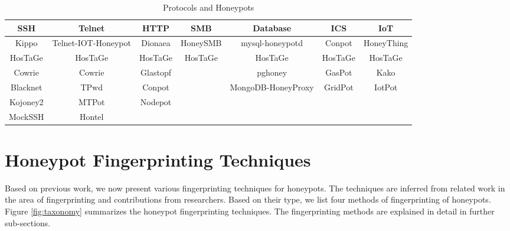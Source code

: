 \documentclass[letterpaper, 10 pt, conference]{ieeeconf}  %
\begin{document}
\begin{table}[ht!]
\caption{\label{tab:Table1}Protocols and Honeypots}
\centering
 \begin{tabular}{||c c c c c c c||} 
 \hline
 SSH & Telnet & HTTP & SMB & Database & ICS & IoT\\ [0.5ex] 
 \hline
 Kippo & Telnet-IOT-Honeypot & Dionaea & HoneySMB & mysql-honeypotd & Conpot & HoneyThing\\ 
 
 HosTaGe &  HosTaGe &  HosTaGe &  HosTaGe &  HosTaGe &  HosTaGe &  HosTaGe  \\
 
 Cowrie & Cowrie & Glastopf &  & pghoney & GasPot & Kako\\

 Blacknet & TPwd & Conpot &  & MongoDB-HoneyProxy & GridPot & IotPot\\
 
 Kojoney2 & MTPot & Nodepot & & & & \\
 
 MockSSH & Hontel &  &  & & & \\ [1ex] 
 \hline
\end{tabular}

\end{table}


\section{Honeypot Fingerprinting Techniques}

Based on previous work, we now present various fingerprinting techniques for honeypots. The techniques are inferred from related work in the area of fingerprinting and contributions from researchers. Based on their type, we list four methods of fingerprinting of honeypots. Figure \ref{fig:taxonomy} summarizes the honeypot fingerprinting techniques.
The fingerprinting methods are explained in detail in further sub-sections. 
\end{document}
